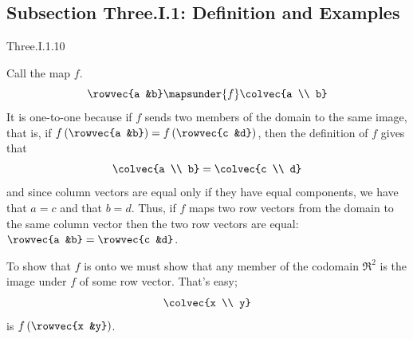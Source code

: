 \subsection{Subsection Three.I.1: Def{}inition and Examples}
\begin{ans}{Three.I.1.10}
     \begin{exparts}
     \partsitem Call the map $f$.
       \begin{equation*}
         \rowvec{a &b} \mapsunder{f} \colvec{a \\ b}
       \end{equation*}
       It is one-to-one because if $f$ sends two members of the domain to
       the same image, that is, if
       $f\left(\rowvec{a &b}\right)=f\left(\rowvec{c &d}\right)$,
       then the definition of $f$ gives that
       \begin{equation*}
          \colvec{a \\ b}=\colvec{c \\ d}
       \end{equation*}
       and since column vectors are equal only if they have equal components,
       we have that $a=c$ and that $b=d$.
       Thus, if $f$ maps two row vectors from the domain to the same column
       vector then the two row vectors are equal:
       $\rowvec{a &b}=\rowvec{c &d}$.

       To show that $f$ is onto we must show that any member of the codomain
       $\Re^2$ is the image under $f$ of some row vector.
       That's easy;
       \begin{equation*}
          \colvec{x \\ y}
       \end{equation*}
       is $f\left(\rowvec{x &y}\right)$.


\end{exparts}
\end{ans}
